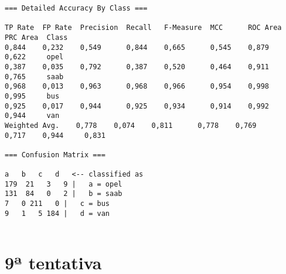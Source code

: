 \documentclass[
	article,			%
	11pt,				%
	oneside,			%
	a4paper,			%
	english,			%
	brazil,				%
	sumario=tradicional
	]{abntex2}
\begin{document}
\begin{lstlisting}
=== Detailed Accuracy By Class ===

TP Rate  FP Rate  Precision  Recall   F-Measure  MCC      ROC Area  PRC Area  Class
0,844    0,232    0,549      0,844    0,665      0,545    0,879     0,622     opel
0,387    0,035    0,792      0,387    0,520      0,464    0,911     0,765     saab
0,968    0,013    0,963      0,968    0,966      0,954    0,998     0,995     bus
0,925    0,017    0,944      0,925    0,934      0,914    0,992     0,944     van
Weighted Avg.    0,778    0,074    0,811      0,778    0,769      0,717    0,944     0,831     

=== Confusion Matrix ===

a   b   c   d   <-- classified as
179  21   3   9 |   a = opel
131  84   0   2 |   b = saab
7   0 211   0 |   c = bus
9   1   5 184 |   d = van


\end{lstlisting}

\section{9ª tentativa}
\end{document}
